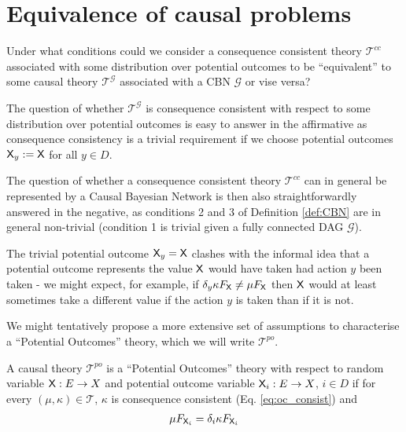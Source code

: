 \section{Equivalence of causal problems}

Under what conditions could we consider a consequence consistent theory $\mathscr{T}^{cc}$ associated with some distribution over potential outcomes to be ``equivalent'' to some causal theory $\mathscr{T}^{\mathcal{G}}$ associated with a CBN $\mathcal{G}$ or vise versa? 

The question of whether $\mathscr{T}^{\mathcal{G}}$ is consequence consistent with respect to some distribution over potential outcomes is easy to answer in the affirmative as consequence consistency is a trivial requirement if we choose potential outcomes $\mathsf{X}_y:=\mathsf{X}$ for all $y\in D$.

The question of whether a consequence consistent theory $\mathscr{T}^{cc}$ can in general be represented by a Causal Bayesian Network is then also straightforwardly answered in the negative, as conditions 2 and 3 of Definition \ref{def:CBN} are in general non-trivial (condition 1 is trivial given a fully connected DAG $\mathcal{G}$).

The trivial potential outcome $\mathsf{X}_y=\mathsf{X}$ clashes with the informal idea that a potential outcome represents the value $\mathsf{X}$ would have taken had action $y$ been taken - we might expect, for example, if $\delta_y\kappa F_{\mathsf{X}}\neq \mu F_{\mathsf{X}}$ then $\mathsf{X}$ would at least sometimes take a different value if the action $y$ is taken than if it is not. 

We might tentatively propose a more extensive set of assumptions to characterise a ``Potential Outcomes'' theory, which we will write $\mathscr{T}^{po}$.

\begin{definition}
A causal theory $\mathscr{T}^{po}$ is a ``Potential Outcomes'' theory with respect to random variable $\mathsf{X}:E\to X$ and potential outcome variable $\mathsf{X}_i:E\to X$, $i\in D$ if for every $(\mu,\kappa)\in \mathscr{T}$, $\kappa$ is consequence consistent (Eq. \ref{eq:oc_consist}) and 
\begin{align}
    \mu F_{\mathsf{X}_i} = \delta_i\kappa F_{\mathsf{X}_i}
\end{align}
\end{definition}


